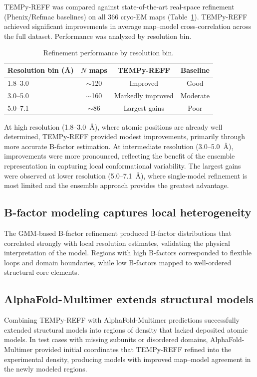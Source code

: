 \documentclass[11pt]{article}
\begin{document}
TEMPy-REFF was compared against state-of-the-art real-space refinement (Phenix/Refmac baselines) on all 366 cryo-EM maps (Table~\ref{tab:benchmark}). TEMPy-REFF achieved significant improvements in average map--model cross-correlation across the full dataset. Performance was analyzed by resolution bin.

\begin{table}[ht]
\centering
\caption{Refinement performance by resolution bin.}
\label{tab:benchmark}
\begin{tabular}{lccc}
\toprule
\textbf{Resolution bin (\AA)} & \textbf{$N$ maps} & \textbf{TEMPy-REFF} & \textbf{Baseline} \\
\midrule
1.8--3.0 & $\sim$120 & Improved & Good \\
3.0--5.0 & $\sim$160 & Markedly improved & Moderate \\
5.0--7.1 & $\sim$86 & Largest gains & Poor \\
\bottomrule
\end{tabular}
\end{table}

At high resolution (1.8--3.0~\AA), where atomic positions are already well determined, TEMPy-REFF provided modest improvements, primarily through more accurate B-factor estimation. At intermediate resolution (3.0--5.0~\AA), improvements were more pronounced, reflecting the benefit of the ensemble representation in capturing local conformational variability. The largest gains were observed at lower resolution (5.0--7.1~\AA), where single-model refinement is most limited and the ensemble approach provides the greatest advantage.

\subsection{B-factor modeling captures local heterogeneity}

The GMM-based B-factor refinement produced B-factor distributions that correlated strongly with local resolution estimates, validating the physical interpretation of the model. Regions with high B-factors corresponded to flexible loops and domain boundaries, while low B-factors mapped to well-ordered structural core elements.

\subsection{AlphaFold-Multimer extends structural models}

Combining TEMPy-REFF with AlphaFold-Multimer predictions successfully extended structural models into regions of density that lacked deposited atomic models. In test cases with missing subunits or disordered domains, AlphaFold-Multimer provided initial coordinates that TEMPy-REFF refined into the experimental density, producing models with improved map--model agreement in the newly modeled regions.
\end{document}
